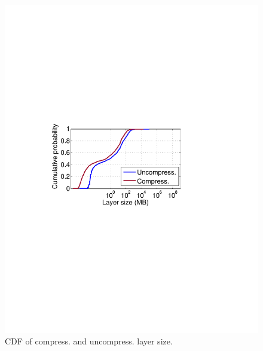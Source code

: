 \begin{figure}[t]
	\centering
	\begin{minipage}{0.22\textwidth}
		\centering
		\includegraphics[width=1\textwidth]{graphs/layer-size-cdf.pdf}
		\caption{CDF of compress. and uncompress. layer size.}
		\label{fig:layer-size-cdf}
	\end{minipage}%
	\begin{minipage}{0.22\textwidth}
		\centering

\end{minipage}
\end{figure}
